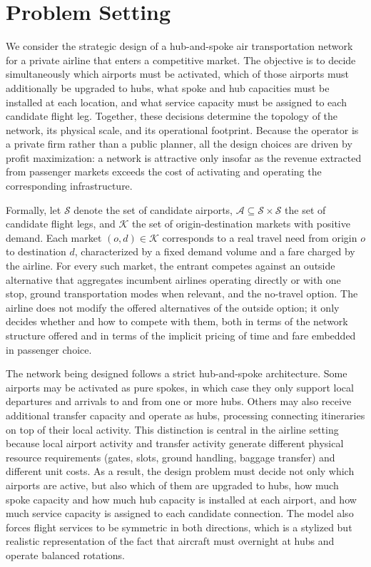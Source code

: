 \section{Problem Setting}
\label{sec:problem_setting}
We consider the strategic design of a hub-and-spoke air transportation network for a private airline that enters a competitive market. The objective is to decide simultaneously which airports must be activated, which of those airports must additionally be upgraded to hubs, what spoke and hub capacities must be installed at each location, and what service capacity must be assigned to each candidate flight leg. Together, these decisions determine the topology of the network, its physical scale, and its operational footprint. Because the operator is a private firm rather than a public planner, all the design choices are driven by profit maximization: a network is attractive only insofar as the revenue extracted from passenger markets exceeds the cost of activating and operating the corresponding infrastructure.

Formally, let $\mathcal{S}$ denote the set of candidate airports, $\mathcal{A}\subseteq\mathcal{S}\times\mathcal{S}$ the set of candidate flight legs, and $\mathcal{K}$ the set of origin-destination markets with positive demand. Each market $(o,d)\in\mathcal{K}$ corresponds to a real travel need from origin $o$ to destination $d$, characterized by a fixed demand volume and a fare charged by the airline. For every such market, the entrant competes against an outside alternative that aggregates incumbent airlines operating directly or with one stop, ground transportation modes when relevant, and the no-travel option. The airline does not modify the offered alternatives of the outside option; it only decides whether and how to compete with them, both in terms of the network structure offered and in terms of the implicit pricing of time and fare embedded in passenger choice.

The network being designed follows a strict hub-and-spoke architecture. Some airports may be activated as pure spokes, in which case they only support local departures and arrivals to and from one or more hubs. Others may also receive additional transfer capacity and operate as hubs, processing connecting itineraries on top of their local activity. This distinction is central in the airline setting because local airport activity and transfer activity generate different physical resource requirements (gates, slots, ground handling, baggage transfer) and different unit costs. As a result, the design problem must decide not only which airports are active, but also which of them are upgraded to hubs, how much spoke capacity and how much hub capacity is installed at each airport, and how much service capacity is assigned to each candidate connection. The model also forces flight services to be symmetric in both directions, which is a stylized but realistic representation of the fact that aircraft must overnight at hubs and operate balanced rotations.

